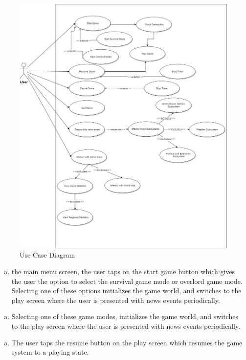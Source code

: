 \documentclass[]{article}
\begin{document}
\begin{figure}[ht!]
\centering
\includegraphics[width=150mm]{ClimatarUseCase}
\caption{Use Case Diagram\label{ucd}}
\end{figure}

\begin{enumerate}[a)]
	\item the main menu screen, the user taps on the start game button which gives the user the option to select the survival game mode or overlord game mode. Selecting one of these options initializes the game world, and switches to the play screen where the user is presented with news events periodically.
\end{enumerate}

\begin{enumerate}[b)]
	\item Selecting one of these game modes, initializes the game world, and switches to the play screen where the user is presented with news events periodically.
\end{enumerate}

\begin{enumerate}[c)]
	\item The user taps the resume button on the play screen which resumes the game system to a playing state.
\end{enumerate}
\end{document}
